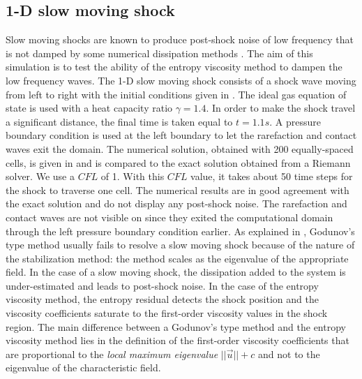 \subsection{1-D slow moving shock} \label{sec:slow_moving_shock}

Slow moving shocks are known to produce post-shock noise of low frequency that is not damped by some numerical dissipation methods \cite{james}. The aim of this simulation is to test the ability of the entropy viscosity method to dampen the low frequency waves.
The 1-D slow moving shock consists of a shock wave moving from left to right with the initial conditions given in . The ideal gas equation of state is used with a heat capacity ratio $\gamma=1.4$.  In order to make the shock travel a significant distance, the final time is taken equal to $t=1.1s$. A pressure boundary condition is used at the left boundary to let the rarefaction and contact waves exit the domain.   
%
The numerical solution, obtained with 200 equally-spaced cells, is given in  and is compared to the exact solution obtained from a Riemann solver. We use a $CFL$ of 1. With this $CFL$ value, it takes about 50 time steps for the shock to traverse one cell.
%
The numerical results are in good agreement with the exact solution and do not display any post-shock noise. The rarefaction and contact waves are not visible on  since they exited the computational domain through the left pressure boundary condition earlier. As explained in \cite{roberts}, Godunov's type method usually fails to resolve a slow moving shock because of the nature of the stabilization method: the method scales as the eigenvalue of the appropriate field. In the case of a slow moving shock, the dissipation added to the system is under-estimated and leads to post-shock noise. In the case of the entropy viscosity method, the entropy residual detects the shock position and the viscosity coefficients saturate to the first-order viscosity values in the shock region. The main difference between a  Godunov's type method and the entropy viscosity method lies in the definition of the first-order viscosity coefficients that are proportional to the \emph{local maximum eigenvalue} $||\vec{u}||+c$ and not to the eigenvalue of the characteristic field.
%
